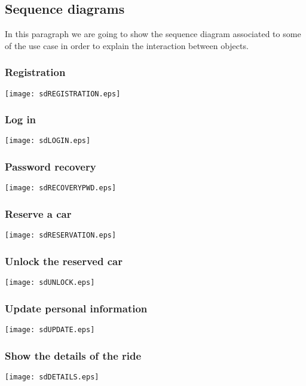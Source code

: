 \pagebreak
\subsection{Sequence diagrams}
In this paragraph we are going to show the sequence diagram associated to some of the use case in order to explain the interaction between objects.

\subsubsection{Registration}
	\centerline{
		\texttt{[image: sdREGISTRATION.eps]}}
	\pagebreak

\subsubsection{Log in}
	\centerline{
		\texttt{[image: sdLOGIN.eps]}}
	\pagebreak

\subsubsection{Password recovery}
	\centerline{
		\texttt{[image: sdRECOVERYPWD.eps]}}
	\pagebreak
	
\subsubsection{Reserve a car}
	\centerline{
		\texttt{[image: sdRESERVATION.eps]}}
	\pagebreak
	
\subsubsection{Unlock the reserved car}
	\centerline{
		\texttt{[image: sdUNLOCK.eps]}}
		\pagebreak

\subsubsection{Update personal information}
	\centerline{
		\texttt{[image: sdUPDATE.eps]}}
	\pagebreak
	
\subsubsection{Show the details of the ride}
	\centerline{
		\texttt{[image: sdDETAILS.eps]}}